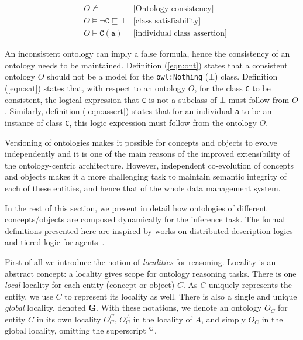 \documentclass[preprint,12pt]{elsarticle}
\begin{document}
\begin{align}
&O\nvDash \bot &\text{[Ontology consistency]}\label{eqn:ont}\\ 
&O\models \lnot \mathtt{C}\sqsubseteq \bot &\text{[class satisfiability]}\label{eqn:sat}\\
&O\models \mathtt{C}(\mathtt{a}) &\text{[individual class assertion]}\label{eqn:assert}
\end{align}

An inconsistent ontology can imply a false formula, hence the consistency of an ontology needs to be maintained. Definition (\ref{eqn:ont}) states that a consistent ontology $O$ should not be a model for the \texttt{owl:Nothing} ($\bot$) class. Definition (\ref{eqn:sat}) states that, with respect to an ontology $O$, for the class \texttt{C} to be consistent, the logical expression that \texttt{C} is not a subclass of $\bot$ must follow from $O$. Similarly, definition (\ref{eqn:assert}) states that for an individual \texttt{a} to be an instance of class \texttt{C}, this logic expression must follow from the ontology $O$.

Versioning of ontologies makes it possible for concepts and objects to evolve independently and it is one of the main reasons of the improved extensibility of the ontology-centric architecture. However, independent co-evolution of concepts and objects makes it a more challenging task to maintain semantic integrity of each of these entities, and hence that of the whole data management system. 

In the rest of this section, we present in detail how ontologies of different concepts/objects are composed dynamically for the inference task. The formal definitions presented here are inspired by works on distributed description logics~\cite{Borgida:2002:DDL:646748.701674} and tiered logic for agents~\cite{DBLP:conf/icaart/CruzC09}.

First of all we introduce the notion of \emph{localities} for reasoning. Locality is an abstract concept: a locality gives scope for ontology reasoning tasks. There is one \emph{local} locality for each entity (concept or object) $C$. As $C$ uniquely represents the entity, we use $C$ to represent its locality as well. There is also a single and unique \emph{global} locality, denoted $\mathbf{G}$. With these notations, we denote an ontology $O_C$ for entity $C$ in its own locality $O_C^C$, $O^A_C$ in the locality of $A$, and simply $O_C$ in the global locality, omitting the superscript $^\mathbf{G}$. 
\end{document}
